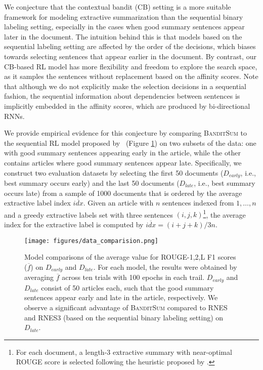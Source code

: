 \documentclass[11pt,a4paper]{article}
\newcommand{\B}{\textsc{BanditSum }}
\begin{document}
We conjecture that the contextual bandit (CB) setting is a more suitable framework for modeling extractive summarization than the sequential binary labeling setting, especially in the cases when good summary sentences appear later in the document. The intuition behind this is that models based on the sequential labeling setting are affected by the order of the decisions, which biases towards selecting sentences that appear earlier in the document. By contrast, our CB-based RL model has more flexibility and freedom to explore the search space, as it samples the sentences without replacement based on the affinity scores. Note that although we do not explicitly make the selection decisions in a sequential fashion, the sequential information about dependencies between sentences is implicitly embedded in the affinity scores, which are produced by bi-directional RNNs.  
 




\newcommand{\Dearly}{\mathit{D}_{\textit{early}}}
\newcommand{\Dlate}{\mathit{D}_{\textit{late}}}

We provide empirical evidence for this conjecture by comparing \B to the sequential RL model proposed by~\citet{DBLP:conf/aaai/WuH18} (Figure \ref{fig:model_comparison}) on two subsets of the data: one with good summary sentences appearing early in the article, while the other contains articles where good summary sentences appear late. Specifically, we construct two evaluation datasets by selecting the first 50 documents ($\Dearly$, i.e., best summary occurs early) and the last 50 documents ($\Dlate$, i.e., best summary occurs late) from a sample of 1000 documents that is ordered by the average extractive label index \textit{$\overline{idx}$}. Given an article with $n$ sentences indexed from $1,\ldots, n$ and a greedy extractive labels set with three sentences $(i,j,k)$\footnote{For each document, a length-$3$ extractive summary with near-optimal ROUGE score is selected following the heuristic proposed by \citet{ext5_summarunner}.},  the average index for the extractive label is computed by \textit{$\overline{idx}$}$ = (i+j+k)/3n$. 


\begin{figure}[!h]
  \texttt{[image: figures/data\_comparision.png]}
  \caption{Model comparisons of the average value for ROUGE-1,2,L F1 scores ($\overline{f}$) on $\Dearly$ and $\Dlate$. For each model, the results were obtained by averaging $\overline{f}$  across ten trials with 100 epochs in each trail. $\Dearly$ and  $\Dlate$ consist of 50 articles each, such that the good summary sentences appear early and late in the article, respectively. We observe a significant advantage of \B compared to RNES and RNES3 (based on the sequential binary labeling setting) on $\mathit{D}_{late}$.}
  \label{fig:model_comparison}
\end{figure}
\end{document}
